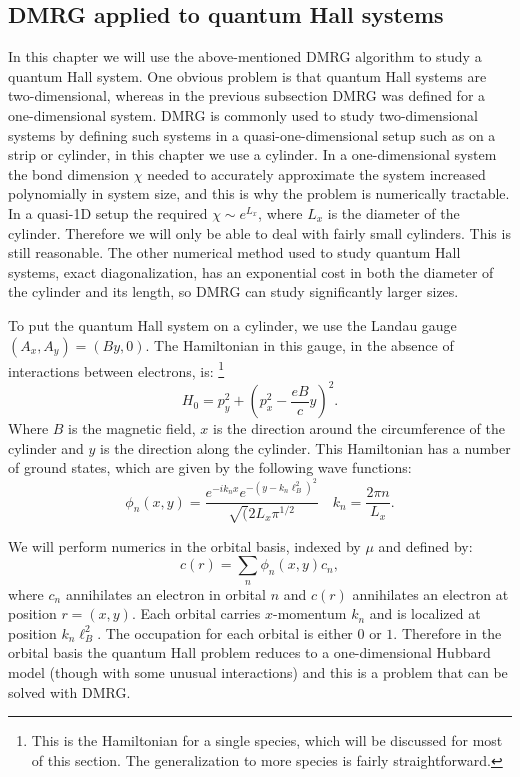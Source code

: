 \subsection{DMRG applied to quantum Hall systems}

In this chapter we will use the above-mentioned DMRG algorithm to study a quantum Hall system. One obvious problem is that quantum Hall systems are two-dimensional, whereas in the previous subsection DMRG was defined for a one-dimensional system. DMRG is commonly used to study two-dimensional systems by defining such systems in a quasi-one-dimensional setup such as on a strip or cylinder, in this chapter we use a cylinder. In a one-dimensional system the bond dimension $\chi$ needed to accurately approximate the system increased polynomially in system size, and this is why the problem is numerically tractable. In a quasi-1D setup the required $\chi\sim e^{L_x}$, where $L_x$ is the diameter of the cylinder. Therefore we will only be able to deal with fairly small cylinders. This is still reasonable. The other numerical method used to study quantum Hall systems, exact diagonalization, has an exponential cost in both the diameter of the cylinder and its length, so DMRG can study significantly larger sizes.

To put the quantum Hall system on a cylinder, we use the Landau gauge $(A_x,A_y)=(By,0)$. The Hamiltonian in this gauge, in the absence of interactions between electrons, is:
\footnote{This is the Hamiltonian for a single species, which will be discussed for most of this section. The generalization to more species is fairly straightforward\cite{ZaletelMixing}.}
\begin{equation}
H_0=p_y^2+\left(p_x^2-\frac{eB}{c}y\right)^2.
\end{equation}
Where $B$ is the magnetic field, $x$ is the direction around the circumference of the cylinder and $y$ is the direction along the cylinder. This Hamiltonian has a number of ground states, which are given by the following wave functions:
\begin{equation}
\phi_n(x,y)=\frac{e^{-ik_nx}e^{-(y-k_n\ell_B^2)^2}}{\sqrt(2L_x\pi^{1/2}} \quad k_n=\frac{2\pi n}{L_x}.
\label{formfactors}
\end{equation}

We will perform numerics in the orbital basis, indexed by $\mu$ and defined by:
\begin{equation}
c(r)=\sum_n \phi_n(x,y)c_n,
\end{equation}
where $c_n$ annihilates an electron in orbital $n$ and $c(r)$ annihilates an electron at position $r=(x,y)$. Each orbital carries $x$-momentum $k_n$ and is localized at position $k_n\ell_B^2$. The occupation for each orbital is either $0$ or $1$. Therefore in the orbital basis the quantum Hall problem reduces to a one-dimensional Hubbard model (though with some unusual interactions) and this is a problem that can be solved with DMRG.
 
